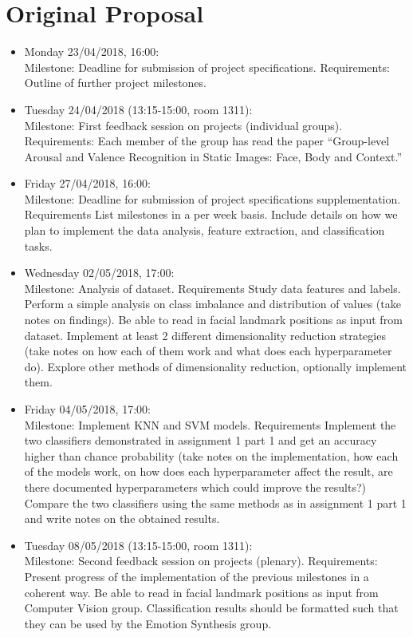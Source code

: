 \section{Original Proposal}

\begin{itemize}
\item Monday 23/04/2018, 16:00: \\
Milestone: Deadline for submission of project specifications.
Requirements:
Outline of further project milestones.

\item Tuesday 24/04/2018 (13:15-15:00, room 1311): \\
Milestone: First feedback session on projects (individual groups).
Requirements:
Each member of the group has read the paper “Group-level Arousal and Valence Recognition in Static Images: Face, Body and Context.”

\item Friday 27/04/2018, 16:00: \\
Milestone: Deadline for submission of project specifications supplementation.
Requirements
List milestones in a per week basis.
Include details on how we plan to implement the data analysis, feature extraction, and classification tasks.

\item Wednesday 02/05/2018, 17:00: \\
Milestone: Analysis of dataset.
Requirements
Study data features and labels.
Perform a simple analysis on class imbalance and distribution of values (take notes on findings).
Be able to read in facial landmark positions as input from dataset.
Implement at least 2 different dimensionality reduction strategies (take notes on how each of them work and what does each hyperparameter do). Explore other methods of dimensionality reduction, optionally implement them.

\item Friday 04/05/2018, 17:00: \\
Milestone: Implement KNN and SVM models.
Requirements
Implement the two classifiers demonstrated in assignment 1 part 1 and get an accuracy higher than chance probability (take notes on the implementation, how each of the models work, on how does each hyperparameter affect the result, are there documented hyperparameters which could improve the results?)
Compare the two classifiers using the same methods as in assignment 1 part 1 and write notes on the obtained results.

\item Tuesday 08/05/2018 (13:15-15:00, room 1311): \\
Milestone: Second feedback session on projects (plenary).
Requirements:
Present progress of the implementation of the previous milestones in a coherent way.
Be able to read in facial landmark positions as input from Computer Vision group.
Classification results should be formatted such that they can be used by the Emotion Synthesis group.


\end{itemize}
